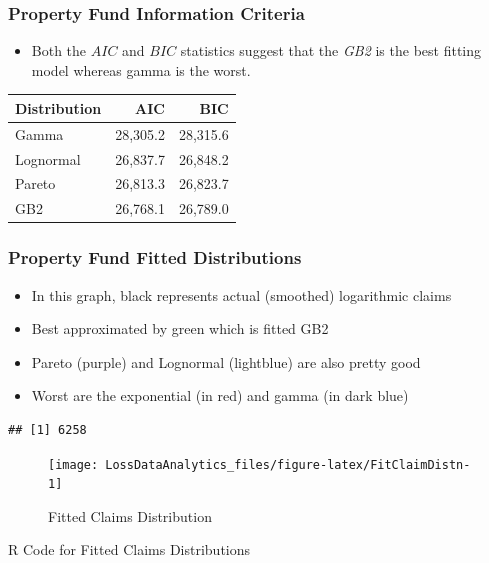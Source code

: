 \documentclass[]{book}
\providecommand{\tightlist}{%
  \setlength{\itemsep}{0pt}\setlength{\parskip}{0pt}}
\theoremstyle{definition}
\theoremstyle{definition}
\theoremstyle{definition}
\theoremstyle{remark}
\begin{document}
\subsubsection{Property Fund Information
Criteria}\label{property-fund-information-criteria}

\begin{itemize}
\tightlist
\item
  Both the \(AIC\) and \(BIC\) statistics suggest that the \emph{GB2} is
  the best fitting model whereas gamma is the worst.
\end{itemize}

\begin{longtable}[]{@{}lrr@{}}
\toprule
Distribution & AIC & BIC\tabularnewline
\midrule
\endhead
Gamma & 28,305.2 & 28,315.6\tabularnewline
Lognormal & 26,837.7 & 26,848.2\tabularnewline
Pareto & 26,813.3 & 26,823.7\tabularnewline
GB2 & 26,768.1 & 26,789.0\tabularnewline
\bottomrule
\end{longtable}

\subsubsection{Property Fund Fitted
Distributions}\label{property-fund-fitted-distributions}

\begin{itemize}
\item
  In this graph, black represents actual (smoothed) logarithmic claims
\item
  Best approximated by green which is fitted GB2
\item
  Pareto (purple) and Lognormal (lightblue) are also pretty good
\item
  Worst are the exponential (in red) and gamma (in dark blue)
\end{itemize}

\begin{verbatim}
## [1] 6258
\end{verbatim}

\begin{figure}

{\centering \texttt{[image: LossDataAnalytics\_files/figure-latex/FitClaimDistn-1]} 

}

\caption{Fitted Claims Distribution}\label{fig:FitClaimDistn}
\end{figure}

R Code for Fitted Claims Distributions
\end{document}
